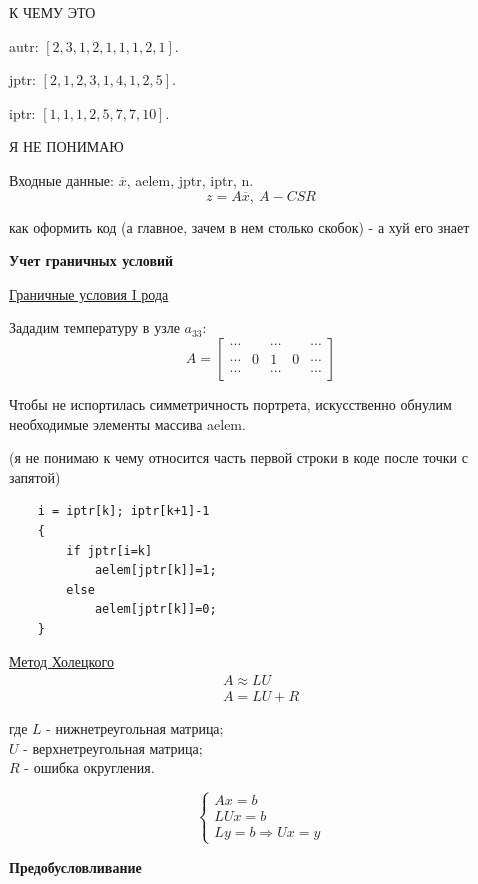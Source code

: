 \documentclass{bmstu}
\begin{document}
К ЧЕМУ ЭТО

autr: $\left[2, 3, 1, 2, 1, 1, 1, 2, 1\right]$.

jptr: $\left[2, 1, 2, 3, 1, 4, 1, 2, 5\right]$.

iptr: $\left[1, 1, 1, 2, 5, 7, 7, 10\right]$.

Я НЕ ПОНИМАЮ

Входные данные: $\overline{x}$, aelem, jptr, iptr, n.
\[
z = A\overline{x}, \ A - CSR
\]

как оформить код (а главное, зачем в нем столько скобок) - а хуй его знает

\newpage
	\begin{center}
	\textbf{Учет граничных условий}
\end{center}

\underline{Граничные условия I рода}

Зададим температуру в узле $a_{33}$:
\[
A=\begin{bmatrix}
	\cdots & &\cdots & &\cdots  \\
	\cdots & 0 & 1 & 0 & \cdots \\
	\cdots & &\cdots & &\cdots 
\end{bmatrix}
\]

Чтобы не испортилась симметричность портрета, искусственно обнулим необходимые элементы массива aelem.  

(я не понимаю к чему относится часть первой строки в коде после точки с запятой)

\begin{lstlisting}
	i = iptr[k]; iptr[k+1]-1
	{ 
		if jptr[i=k]
			aelem[jptr[k]]=1;
		else
			aelem[jptr[k]]=0;
	}
\end{lstlisting}

\underline{Метод Холецкого}
\[ \begin{matrix}
	A\approx LU\\A = LU+R
\end{matrix}
\]

где $L$ - нижнетреугольная матрица;\\
\hangindent=2.05cm
$U$ - верхнетреугольная матрица;\\
	$R$ - ошибка округления.
	
	\[
	\begin{cases}
		Ax= b \\ LUx= b \\ Ly = b \Rightarrow Ux=y
	\end{cases}
	\]
	
	\newpage
	\begin{center}
		\textbf{Предобусловливание}
	\end{center}
	
\end{document}
